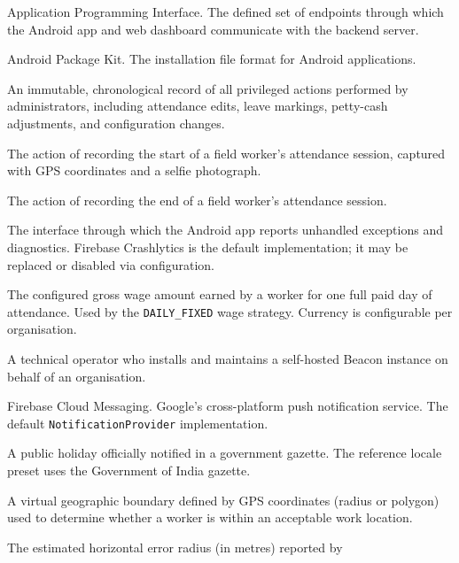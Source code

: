 \documentclass[12pt, a4paper]{article}
\begin{document}
\begin{description}[leftmargin=4cm, style=nextline]
    \item[API]
        Application Programming Interface. The defined set of endpoints
        through which the Android app and web dashboard communicate with
        the backend server.
    \item[APK]
        Android Package Kit. The installation file format for Android
        applications.
    \item[Audit Log]
        An immutable, chronological record of all privileged actions
        performed by administrators, including attendance edits, leave
        markings, petty-cash adjustments, and configuration changes.
    \item[Clock-In]
        The action of recording the start of a field worker's attendance
        session, captured with GPS coordinates and a selfie photograph.
    \item[Clock-Out]
        The action of recording the end of a field worker's attendance
        session.
    \item[CrashReporter]
        The interface through which the Android app reports unhandled
        exceptions and diagnostics. Firebase Crashlytics is the default
        implementation; it may be replaced or disabled via configuration.
    \item[Daily Rate]
        The configured gross wage amount earned by a worker for one full
        paid day of attendance. Used by the \texttt{DAILY\_FIXED} wage
        strategy. Currency is configurable per organisation.
    \item[Deployer]
        A technical operator who installs and maintains a self-hosted
        Beacon instance on behalf of an organisation.
    \item[FCM]
        Firebase Cloud Messaging. Google's cross-platform push
        notification service. The default \texttt{NotificationProvider}
        implementation.
    \item[Gazetted Holiday]
        A public holiday officially notified in a government gazette.
        The reference locale preset uses the Government of India gazette.
    \item[Geofence]
        A virtual geographic boundary defined by GPS coordinates (radius
        or polygon) used to determine whether a worker is within an
        acceptable work location.
    \item[GPS Accuracy]
        The estimated horizontal error radius (in metres) reported by

\end{description}
\end{document}
